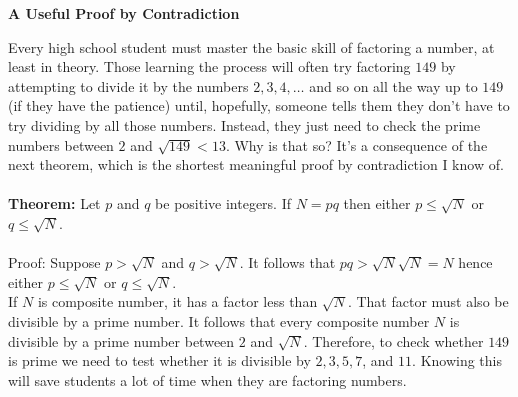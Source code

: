 \documentclass[12pt]{article}
\begin{document}
\begin{center}
\Large{\textbf{A Useful Proof by Contradiction}}
\end{center}
Every high school student must master the basic skill of factoring
a number, at least in theory.  Those learning the process 
will often try factoring $149$ by attempting to divide it by the 
numbers $2, 3, 4, \ldots$ and so on all the way up to $149$ (if 
they have the patience) until, hopefully, someone tells them they 
don't have to try dividing by all those numbers. Instead, they
just need to check the prime numbers between $2$ and 
$\sqrt{149} <13$. Why is that so? It's a consequence of the 
next theorem, which is the shortest meaningful proof by 
contradiction I know of.\\\\
\textbf{Theorem:} Let $p$ and $q$  be positive integers. If 
$N=pq$ then either $p \leq \sqrt{N}$ or $q \leq \sqrt{N}$.\\\\
Proof: Suppose $p > \sqrt{N}$ and $q > \sqrt{N}$. It follows
 that $pq > \sqrt{N}\sqrt{N}=N$ hence either $p \leq \sqrt{N}$
 or $q \leq \sqrt{N}$.\\
 
If $N$ is composite number, it has a factor less than $\sqrt{N}$.
That factor must also be divisible by a prime number. It follows
that every composite number $N$ is divisible by a prime number 
between $2$ and $\sqrt{N}$. Therefore, to check whether $149$ is
prime we need to test whether it is divisible by $2, 3, 5, 7$, and 
$11$. Knowing this will save students a lot of time when they
are factoring numbers. 
\end{document}
